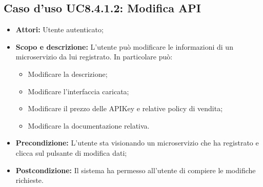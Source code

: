 \documentclass[12pt,a4paper,titlepage]{article}
\begin{document}
	\subsection{Caso d'uso UC8.4.1.2: Modifica API}
	\label{UC8.4.1.2}
	\begin{itemize}
		\item \textbf{Attori: }Utente autenticato;
		\item \textbf{Scopo e descrizione: }L'utente può modificare le informazioni di un microservizio da lui registrato. In particolare può:
		\begin{itemize}
			\item Modificare la descrizione;
			\item Modificare l'interfaccia caricata;
			\item Modificare il prezzo delle APIKey e relative policy di vendita;
			\item Modificare la documentazione relativa.
		\end{itemize}
		\item \textbf{Precondizione: }L'utente sta visionando un microservizio che ha registrato e clicca sul pulsante di modifica dati;
		\item \textbf{Postcondizione: }Il sistema ha permesso all'utente di compiere le modifiche richieste.
	\end{itemize}
\end{document}
